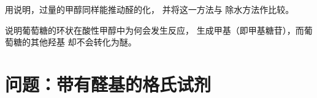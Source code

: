 \begin{exercise}[$\star\star\star$]\label{exo:b1:acetals-protection:11}
用说明，过量的甲醇同样能推动醛的化，
并将这一方法与
除水方法作比较。
\end{exercise}

\begin{exercise}[$\star\star\star$]\label{exo:b1:acetals-protection:12}
说明葡萄糖的环状在酸性甲醇中为何会发生反应，
生成甲基（即甲基糖苷），而葡萄糖的其他羟基
却不会转化为醚。
\end{exercise}

\section{问题：带有醛基的格氏试剂}

